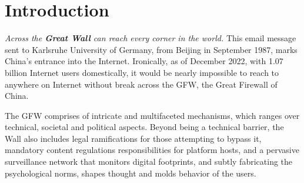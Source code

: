 \documentclass[nonacm,sigplan,screen]{acmart}
\begin{document}




\maketitle

\section{Introduction}
\emph{Across the \textbf{Great Wall} can reach every corner in the
world.} \cite{01_hist1986} This email message sent to Karlsruhe
University of Germany, from Beijing in September 1987, marks China's
entrance into the Internet. Ironically, as of December 2022, with 1.07
billion Internet users domestically, \cite{02_stat2022} it would be
nearly impossible to reach to anywhere on Internet without break across
the GFW, the Great Firewall of China.

The GFW comprises of intricate and multifaceted mechanisms, which ranges
over technical, societal and political aspects. Beyond being a technical
barrier, the Wall also includes legal ramifications for those attempting
to bypass it, mandatory content regulations responsibilities for
platform hosts, and a pervasive surveillance network that monitors
digital footprints, and subtly fabricating the psychological norms,
shapes thought and molds behavior of the users.
\end{document}
